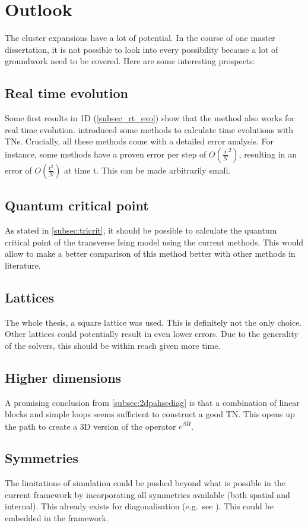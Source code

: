 \section{Outlook}

The cluster expansions have a lot of potential. In the course of one master dissertation, it is not possible to look into every possibility because a lot of groundwork need to be covered. Here are some interesting prospects:

\subsection*{Real time evolution}

Some first results in 1D (\cref{subsec_rt_evo}) show that the method also works for real time evolution.  introduced some methods to calculate time evolutions with \Glspl{TN}. Crucially, all these methods come with a detailed error analysis. For instance, some methods have a proven error per step of $O \left( \frac{t}{N}^2  \right)$, resulting in an error of $O \left( \frac{t^2}{N}  \right)$ at time t. This can be made arbitrarily small.

\subsection*{Quantum critical point}

As stated in \cref{subsec:tricrit}, it should be possible to calculate the quantum critical point of the transverse Ising model using the current methods. This would allow to make a better comparison of this method better with other methods in literature.

\subsection*{Lattices}

The whole thesis, a square lattice was used. This is definitely not the only choice. Other lattices could potentially result in even lower errors. Due to the generality of the solvers, this should be within reach given more time.

\subsection*{Higher dimensions}

A promising conclusion from \cref{subsec:2dpahsediag} is that a combination of linear blocks and simple loops seems sufficient to construct a good \Gls{TN}. This opens up the path to create a 3D version of the operator $e^{\beta \hat{H}}$.

\subsection*{Symmetries}

The limitations of simulation could be pushed beyond what is possible in the current framework by incorporating all symmetries available (both spatial and internal). This already exists for diagonalisation (e.g.\ see \cite{Wietek2018}). This could be embedded in the framework.
